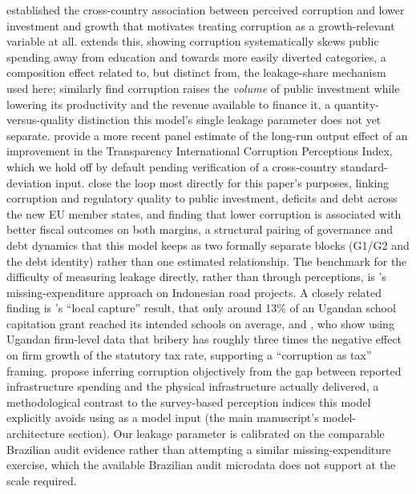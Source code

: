 \documentclass[11pt,a4paper]{article}
\begin{document}
\citet{mauro1995} established the cross-country association between perceived corruption and lower investment and growth that motivates treating corruption as a growth-relevant variable at all. \citet{mauro1998} extends this, showing corruption systematically skews public spending away from education and towards more easily diverted categories, a composition effect related to, but distinct from, the leakage-share mechanism used here; \citet{tanzidavoodi1997} similarly find corruption raises the \emph{volume} of public investment while lowering its productivity and the revenue available to finance it, a quantity-versus-quality distinction this model's single leakage parameter does not yet separate. \citet{grundlerpotrafke2019} provide a more recent panel estimate of the long-run output effect of an improvement in the Transparency International Corruption Perceptions Index, which we hold off by default pending verification of a cross-country standard-deviation input. \citet{hanousekkocenda2011} close the loop most directly for this paper's purposes, linking corruption and regulatory quality to public investment, deficits and debt across the new EU member states, and finding that lower corruption is associated with better fiscal outcomes on both margins, a structural pairing of governance and debt dynamics that this model keeps as two formally separate blocks (G1/G2 and the debt identity) rather than one estimated relationship. The benchmark for the difficulty of measuring leakage directly, rather than through perceptions, is \citet{olken2007}'s missing-expenditure approach on Indonesian road projects. A closely related finding is \citet{reinikkasvensson2004}'s ``local capture'' result, that only around 13\% of an Ugandan school capitation grant reached its intended schools on average, and \citet{fismansvensson2007}, who show using Ugandan firm-level data that bribery has roughly three times the negative effect on firm growth of the statutory tax rate, supporting a ``corruption as tax'' framing. \citet{goldenpicci2005} propose inferring corruption objectively from the gap between reported infrastructure spending and the physical infrastructure actually delivered, a methodological contrast to the survey-based perception indices this model explicitly avoids using as a model input (the main manuscript's model-architecture section). Our leakage parameter is calibrated on the comparable Brazilian audit evidence rather than attempting a similar missing-expenditure exercise, which the available Brazilian audit microdata does not support at the scale required.
\end{document}
